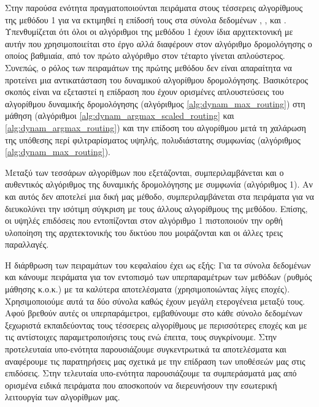 Στην παρούσα ενότητα πραγματοποιούνται πειράματα στους τέσσερεις αλγορίθμους της μεθόδου 1 για να εκτιμηθεί η επίδοσή τους στα σύνολα δεδομένων \cite{deng2012mnist}, \cite{Xiao2017FashionMNISTAN}, \cite{CIFAR10} και \cite{lecun2004learning}. Υπενθυμίζεται ότι όλοι οι αλγόριθμοι της μεθόδου 1 έχουν ίδια αρχιτεκτονική με αυτήν που χρησιμοποιείται στο έργο \cite{sabour2017dynamic} αλλά διαφέρουν στον αλγόριθμο δρομολόγησης ο οποίος βαθμιαία, από τον πρώτο αλγόριθμο στον τέταρτο γίνεται απλούστερος. Συνεπώς, ο ρόλος των πειραμάτων της πρώτης μεθόδου δεν είναι απαραίτητα να προτείνει μια αντικατάσταση του δυναμικού αλγορίθμου δρομολόγησης. Βασικότερος σκοπός είναι να εξεταστεί η επίδραση που έχουν ορισμένες απλουστεύσεις του αλγορίθμου δυναμικής δρομολόγησης (αλγόριθμος \ref{alg:dynam_max_routing}) στη μάθηση (αλγόριθμοι \ref{alg:dynam_argmax_scaled_routing} και \ref{alg:dynam_argmax_routing}) και την επίδοση του αλγορίθμου μετά τη χαλάρωση της υπόθεσης περί φιλτραρίσματος υψηλής, πολυδιάστατης συμφωνίας (αλγόριθμος \ref{alg:dynam_max_routing}).\par

Μεταξύ των τεσσάρων αλγορίθμων που εξετάζονται, συμπεριλαμβάνεται και ο αυθεντικός αλγόριθμος της δυναμικής δρομολόγησης με συμφωνία (αλγόριθμος 1). Αν και αυτός δεν αποτελεί μια δική μας μέθοδο, συμπεριλαμβάνεται στα πειράματα για να διευκολύνει την ισότιμη σύγκριση με τους άλλους αλγορίθμους της μεθόδου. Επίσης, οι υψηλές επιδόσεις που εντοπίζονται στον αλγόριθμο 1 πιστοποιούν την ορθή υλοποίηση της αρχιτεκτονικής του δικτύου που μοιράζονται και οι άλλες τρεις παραλλαγές.\par

Η διάρθρωση των πειραμάτων του κεφαλαίου έχει ως εξής: Για τα σύνολα δεδομένων  και  κάνουμε πειράματα για τον εντοπισμό των υπερπαραμέτρων των μεθόδων (ρυθμός μάθησης κ.ο.κ.) με τα καλύτερα αποτελέσματα (χρησιμοποιώντας λίγες εποχές). Χρησιμοποιούμε αυτά τα δύο σύνολα καθώς έχουν μεγάλη ετερογένεια μεταξύ τους. Αφού βρεθούν αυτές οι υπερπαράμετροι, εμβαθύνουμε στο κάθε σύνολο δεδομένων ξεχωριστά εκπαιδεύοντας τους τέσσερεις αλγορίθμους με περισσότερες εποχές και με τις αντίστοιχες παραμετροποιήσεις τους ενώ έπειτα, τους συγκρίνουμε. Στην προ\textendash τελευταία υπο-ενότητα παρουσιάζουμε συγκεντρωτικά τα αποτελέσματα και αναφέρουμε τις παρατηρήσεις μας σχετικά με την επίδραση των υποθέσεών μας στις επιδόσεις. Στην τελευταία υπο-ενότητα παρουσιάζουμε τα συμπεράσματά μας από ορισμένα ειδικά πειράματα που αποσκοπούν να διερευνήσουν την εσωτερική λειτουργία των αλγορίθμων μας.\par

